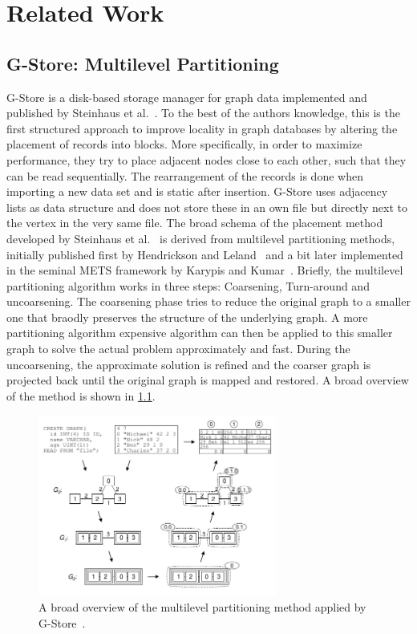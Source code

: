 \chapter{Related Work}\label{\positionnumber}
\section{G-Store: Multilevel Partitioning}\label{\positionnumber}
    G-Store is a disk-based storage manager for graph data implemented and published by Steinhaus et al.~\autocite{steinhaus2010g}. 
    To the best of the authors knowledge, this is the first structured approach to improve locality in graph databases by altering the placement of records into blocks.
    More specifically, in order to maximize performance, they try to place adjacent nodes close to each other, such that they can be read sequentially. 
    The rearrangement of the records is done when importing a new data set and is static after insertion.
    G-Store uses adjacency lists as data structure and does not store these in an own file but directly next to the vertex in the very same file.
    The broad schema of the placement method developed by Steinhaus et al.~\autocite{steinhaus2010g} is derived from multilevel partitioning methods, initially published first by Hendrickson and Leland~\autocite{hendrickson1995multi} and a bit later implemented in the seminal METS framework by Karypis and Kumar~\autocite{karypis}.
    Briefly, the multilevel partitioning algorithm works in three steps: Coarsening, Turn-around and uncoarsening. 
    The coarsening phase tries to reduce the original graph to a smaller one that braodly preserves the structure of the underlying graph. 
    A more partitioning algorithm expensive algorithm can then be applied to this smaller graph to solve the actual problem approximately and fast.
    During the uncoarsening, the approximate solution is refined and the coarser graph is projected back until the original graph is mapped and restored.
    A broad overview of the method is shown in \ref{g-store}.
    
    \begin{figure}
        \begin{center}
            \includegraphics[keepaspectratio,width=0.7\textwidth]{img/05-rel_w/g-store.png}
        \end{center}
        \caption{A broad overview of the multilevel partitioning method applied by G-Store~\autocite{steinhaus2010g}.} 
        \label{g-store}
    \end{figure}

